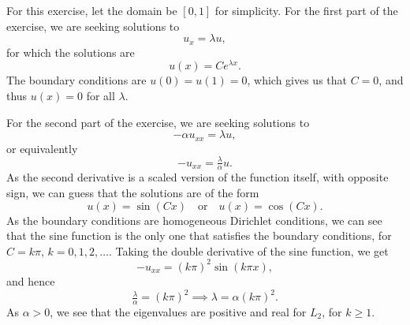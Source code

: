 \begin{solution}{5.6}
    For this exercise, let the domain be $[0, 1]$ for simplicity.
    For the first part of the exercise, we are seeking solutions to
    \begin{equation}
        u_x = \lambda u,
    \end{equation}
    for which the solutions are
    \begin{equation}
        u(x) = C e^{\lambda x}.
    \end{equation}
    The boundary conditions are $u(0) = u(1) = 0$, which gives us that $C = 0$, and thus $u(x) = 0$ for all $\lambda$.

    For the second part of the exercise, we are seeking solutions to
    \begin{equation}
        -\alpha u_{xx} = \lambda u,
    \end{equation}
    or equivalently
    \begin{equation}
        -u_{xx} = \tfrac{\lambda}{\alpha} u.
    \end{equation}
    As the second derivative is a scaled version of the function itself, with opposite sign, we can guess that the solutions are of the form
    \begin{equation}
        u(x) = \sin(C x)
        \quad \text{or} \quad
        u(x) = \cos(C x).
    \end{equation}
    As the boundary conditions are homogeneous Dirichlet conditions, we can see that the sine function is the only one that satisfies the boundary conditions, for $C = k \pi$, $k = 0, 1, 2, \ldots$.
    Taking the double derivative of the sine function, we get
    \begin{equation}
        -u_{xx} = (k \pi)^2 \sin(k \pi x),
    \end{equation}
    and hence
    \begin{equation}
        \tfrac{\lambda}{\alpha} = (k \pi)^2 \implies \lambda = \alpha (k \pi)^2.
    \end{equation}
    As $\alpha > 0$, we see that the eigenvalues are positive and real for $L_2$, for $k \geq 1$.


\end{solution}
